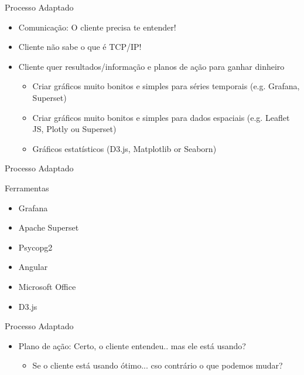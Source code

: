 \begin{frame}
	\begin{block}{Processo Adaptado}
		\begin{itemize}
		\item Comunicação: O cliente precisa te entender!
		\item Cliente não sabe o que é TCP/IP!
		\item Cliente quer resultados/informação e planos de ação para ganhar dinheiro
				\begin{itemize}
					\item Criar gráficos muito bonitos e simples para séries temporais (e.g. Grafana, Superset)
					\item Criar gráficos muito bonitos e simples para dados espaciais (e.g. Leaflet JS, Plotly ou Superset)
					\item Gráficos estatísticos (D3.js, Matplotlib or Seaborn)
					
				\end{itemize}		
		\end{itemize}
	\end{block}
\end{frame}

    
\begin{frame}
	\begin{block}{Processo Adaptado}
	
		Ferramentas
		\begin{itemize}
			\item Grafana
			\item Apache Superset
			\item Psycopg2
			\item Angular
			\item Microsoft Office
			\item D3.js
		\end{itemize}
	\end{block}
\end{frame}



\begin{frame}
	\begin{block}{Processo Adaptado}
		\begin{itemize}
			\item Plano de ação: Certo, o cliente entendeu.. mas ele está usando?		
				\begin{itemize}
					\item Se o cliente está usando ótimo... cso contrário o que podemos mudar?					
				\end{itemize}		
		\end{itemize}
	\end{block}
\end{frame}


